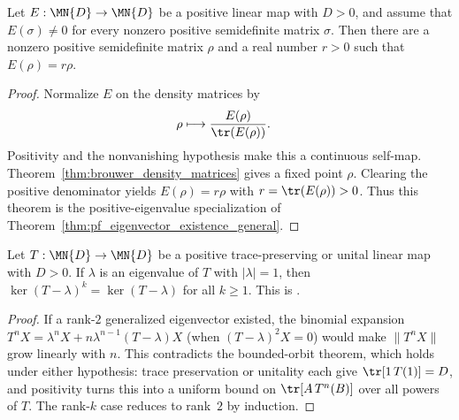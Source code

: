 \begin{theorem}
    \label{thm:pf_eigenvector_existence}
    \leanok
    Let $E:\MN{D}\to\MN{D}$ be a positive linear map with $D>0$, and assume
    that $E(\sigma)\neq0$ for every nonzero positive semidefinite matrix
    $\sigma$. Then there are a nonzero positive semidefinite matrix $\rho$
    and a real number $r>0$ such that $E(\rho)=r\rho$.
\end{theorem}

\begin{proof}\leanok
    Normalize $E$ on the density matrices by
    \begin{align}
        \rho
         & \longmapsto\frac{E(\rho)}{\tr(E(\rho))}.
        \notag
    \end{align}
    Positivity and the nonvanishing hypothesis make this a continuous
    self-map. Theorem~\ref{thm:brouwer_density_matrices} gives a fixed point
    $\rho$. Clearing the positive denominator yields
    $E(\rho)=r\rho$ with $r=\tr(E(\rho))>0$. Thus this theorem is the
    positive-eigenvalue specialization of
    Theorem~\ref{thm:pf_eigenvector_existence_general}.
\end{proof}

\begin{theorem}
    \label{thm:peripheral_jordan_trivial}
    \leanok
    Let $T:\MN{D}\to\MN{D}$ be a positive trace-preserving or unital
    linear map with $D>0$.  If $\lambda$ is an eigenvalue of $T$ with
    $|\lambda|=1$, then $\ker(T-\lambda)^k=\ker(T-\lambda)$ for all
    $k\ge1$.  This is \cite[Proposition~6.2]{Wolf2012Quantum}.
\end{theorem}

\begin{proof}\leanok
    If a rank-$2$ generalized eigenvector existed, the binomial expansion
    $T^n X=\lambda^n X+n\lambda^{n-1}(T-\lambda)X$ (when
    $(T-\lambda)^2X=0$) would make $\|T^nX\|$ grow linearly with $n$.  This
    contradicts the bounded-orbit theorem, which holds under either
    hypothesis: trace preservation or unitality each give
    $\tr[1\,T(1)]=D$, and positivity turns this into a uniform bound on
    $\tr[A\,T^n(B)]$ over all powers of $T$.  The rank-$k$ case reduces to
    rank~$2$ by induction.
\end{proof}

